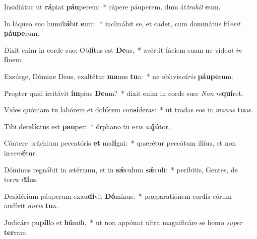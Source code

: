 \item Insidiátur ut \textbf{rá}piat \textbf{páu}perem:~* rápere páuperem, dum át\textit{tra}\textit{hit} \textbf{e}um.
\item In láqueo suo humili\textbf{á}bit \textbf{e}um:~* inclinábit se, et cadet, cum dominátus fú\textit{e}\textit{rit} \textbf{páu}\textbf{pe}rum.
\item Dixit enim in corde suo: Ob\textbf{lí}tus est \textbf{De}us,~* avértit fáciem suam ne víde\textit{at} \textit{in} \textbf{fi}nem.
\item Exsúrge, Dómine Deus, exaltétur \textbf{ma}nus \textbf{tu}a:~* ne oblivis\textit{cá}\textit{ris} \textbf{páu}\textbf{pe}rum.
\item Propter quid irritávit \textbf{ím}pius \textbf{De}um?~* dixit enim in corde suo: \textit{Non} \textit{re}\textbf{quí}ret.
\item Vides quóniam tu labórem et do\textbf{ló}rem con\textbf{sí}deras:~* ut tradas eos in \textit{ma}\textit{nus} \textbf{tu}as.
\item Tibi dere\textbf{líc}tus est \textbf{pau}per:~* órphano tu e\textit{ris} \textit{ad}\textbf{jú}tor.
\item Cóntere bráchium peccatóris \textbf{et} ma\textbf{lí}gni:~* quærétur peccátum illíus, et non in\textit{ve}\textit{ni}\textbf{é}tur.
\item Dóminus regnábit in ætérnum, et in \textbf{sǽ}culum \textbf{sǽ}culi:~* períbitis, Gentes, de ter\textit{ra} \textit{il}\textbf{lí}us.
\item Desidérium páuperum exau\textbf{dí}vit \textbf{Dó}minus:~* præparatiónem cordis eórum audívit \textit{au}\textit{ris} \textbf{tu}a.
\item Judicáre pu\textbf{píl}lo et \textbf{hú}mili,~* ut non appónat ultra magnificáre se homo \textit{su}\textit{per} \textbf{ter}ram.
